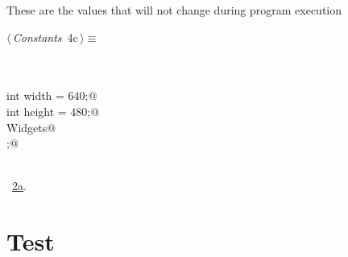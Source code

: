 \documentclass{article}
\renewcommand{\NWtarget}[2]{\hypertarget{#1}{#2}}
\renewcommand{\NWlink}[2]{\hyperlink{#1}{#2}}
\begin{document}
These are the values that will not change during program execution
\begin{flushleft} \small
\begin{minipage}{\linewidth}\label{scrap8}\raggedright\small
\NWtarget{nuweb4c}{} $\langle\,${\it Constants}\nobreak\ {\footnotesize {4c}}$\,\rangle\equiv$
\vspace{-1ex}
\begin{list}{}{} \item
\mbox{}\verb@@\\
\mbox{}\verb@@\\
\mbox{}\verb@const int width = 640;@\\
\mbox{}\verb@const int height = 480;@\\
\mbox{}\verb@struct Widgets@\\
\mbox{};@\\
\mbox{}\verb@@\\
\mbox{}\verb@@{\NWsep}
\end{list}
\vspace{-1.5ex}
\footnotesize
\begin{list}{}{\setlength{\itemsep}{-\parsep}\setlength{\itemindent}{-\leftmargin}}
\item \NWtxtMacroRefIn\ \NWlink{nuweb2a}{2a}.

\item{}
\end{list}
\end{minipage}\vspace{4ex}
\end{flushleft}
\section{Test}
\end{document}
